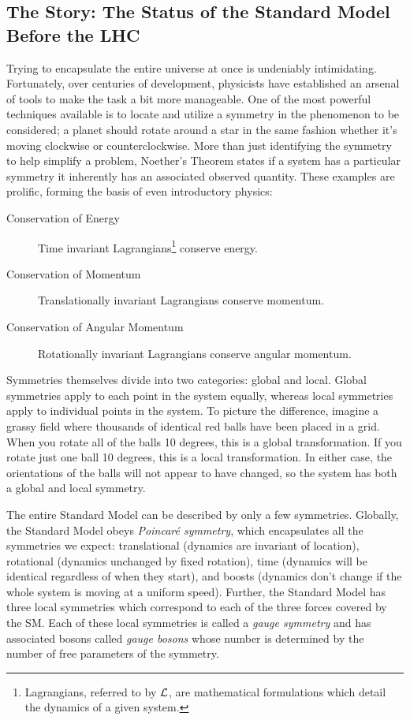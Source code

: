 \subsection{The Story: The Status of the Standard Model Before the LHC}
\label{sec:SMpreLHC}

Trying to encapsulate the entire universe at once is undeniably intimidating. Fortunately, over centuries of development, physicists have established an arsenal of tools to make the task a bit more manageable. One of the most powerful techniques available is to locate and utilize a symmetry in the phenomenon to be considered; a planet should rotate around a star in the same fashion whether it's moving clockwise or counterclockwise. More than just identifying the symmetry to help simplify a problem, Noether's Theorem states if a system has a particular symmetry it inherently has an associated observed quantity. These examples are prolific, forming the basis of even introductory physics:

\begin{description}
\item[Conservation of Energy]
Time invariant Lagrangians\footnote{Lagrangians, referred to by $\mathcal{L}$, are mathematical formulations which detail the dynamics of a given system.} conserve energy.
\item[Conservation of Momentum]
Translationally invariant Lagrangians conserve momentum.
\item[Conservation of Angular Momentum]
Rotationally invariant Lagrangians conserve angular momentum.
\end{description}

Symmetries themselves divide into two categories: global and local. Global symmetries apply to each point in the system equally, whereas local symmetries apply to individual points in the system. To picture the difference, imagine a grassy field where thousands of identical red balls have been placed in a grid. When you rotate all of the balls 10 degrees, this is a global transformation. If you rotate just one ball 10 degrees, this is a local transformation. In either case, the orientations of the balls will not appear to have changed, so the system has both a global and local symmetry.

The entire Standard Model can be described by only a few symmetries. Globally, the Standard Model obeys \textit{Poincar\'{e} symmetry}, which encapsulates all the symmetries we expect: translational (dynamics are invariant of location), rotational (dynamics unchanged by fixed rotation), time (dynamics will be identical regardless of when they start), and boosts (dynamics don't change if the whole system is moving at a uniform speed). Further, the Standard Model has three local symmetries which correspond to each of the three forces covered by the SM. Each of these local symmetries is called a {\it gauge symmetry} and has associated bosons called {\it gauge bosons} whose number is determined by the number of free parameters of the symmetry.

